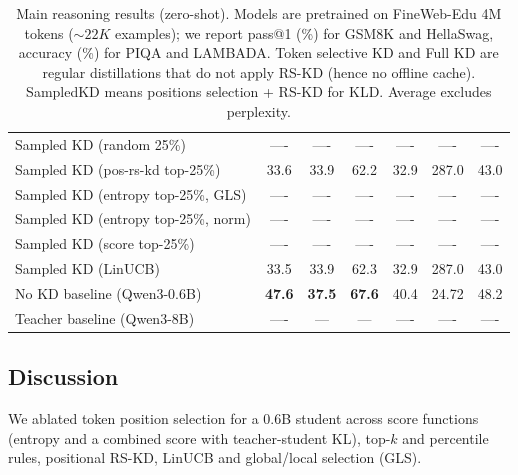 \documentclass[11pt]{article}
\begin{document}
\begin{table}[t]
{\begin{tabular}{lcccccc}
		Sampled KD (random 25\%)         		   & ----                  & ----                      & ----                 & ----                        & ----                    & ----          \\
		Sampled KD (pos-rs-kd top-25\%)            & 33.6                  & 33.9                      & 62.2                 & 32.9                        & 287.0                   & 43.0          \\
		Sampled KD (entropy top-25\%, GLS) 		   & ----                  & ----                      & ----                 & ----                        & ----                    & ----          \\
		Sampled KD (entropy top-25\%, norm)		   & ----                  & ----                      & ----                 & ----                        & ----                    & ----          \\
		Sampled KD (score top-25\%)         	   & ----                  & ----                      & ----                 & ----                        & ----                    & ----          \\
		Sampled KD (LinUCB)			               & 33.5                  & 33.9                      & 62.3                 & 32.9                        & 287.0                   & 43.0          \\
		\midrule
		No KD baseline (Qwen3-0.6B)      & \textbf{47.6}         & \textbf{37.5}             & \textbf{67.6}        & 40.4                        & 24.72                   & 48.2          \\
		Teacher baseline (Qwen3-8B)      & ----                  & ---                       & ---                 	& ----                        & ----                    & ----          \\
		\bottomrule
	\end{tabular}
	} %
	\caption{Main reasoning results (zero-shot). Models are pretrained on FineWeb-Edu 4M tokens ($\sim 22K$ examples); we report pass@1 (\%) for GSM8K and HellaSwag, accuracy (\%) for PIQA and LAMBADA.
		Token selective KD and Full KD are regular distillations that do not apply RS-KD (hence no offline cache).
		SampledKD means positions selection + RS-KD for KLD.
		Average excludes perplexity.}
	\label{tab:main-reasoning}
\end{table}


\subsection{Discussion}
\label{sec:discussion}
We ablated token position selection for a 0.6B student across score functions (entropy and a combined score with teacher-student KL), top-$k$ and percentile rules, positional RS-KD, LinUCB and global/local selection (GLS).
\end{document}
